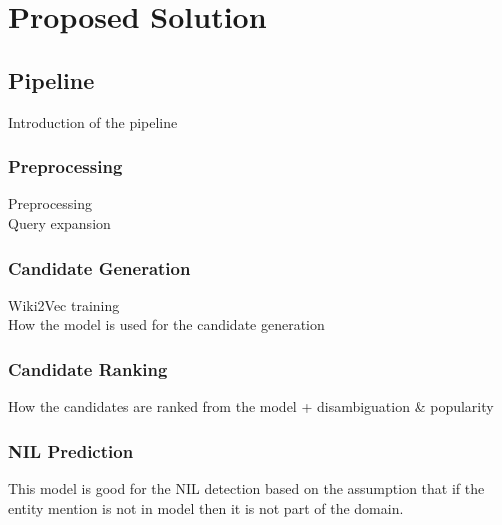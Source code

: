 \chapter{Proposed Solution}
\section{Pipeline}
Introduction of the pipeline
\subsection{Preprocessing}
Preprocessing\\
Query expansion
\subsection{Candidate Generation}
Wiki2Vec training \\
How the model is used for the candidate generation
\subsection{Candidate Ranking}
How the candidates are ranked from the model + disambiguation \& popularity
\subsection{NIL Prediction}
This model is good for the NIL detection based on the assumption that if the entity mention is not in model then it is not part of the domain.